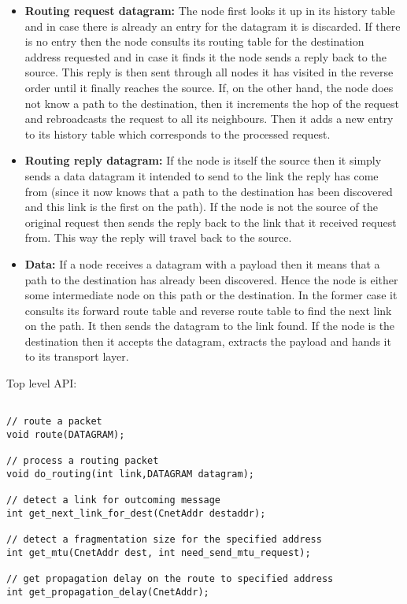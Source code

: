 \documentclass[11pt,a4paper,oneside]{report}
\begin{document}
\begin{itemize}
\item \noindent \textbf{Routing request datagram:}
The node first looks it up in its history table and in case there
is already an entry for the datagram it is discarded. If there is no entry then the node 
consults its routing table for the destination address requested and in case it finds it 
the node sends a reply back to the source. This reply is then sent through all nodes it 
has visited in the reverse order until it finally reaches the source. If, on the other hand,
the node does not know a path to the destination, then it increments the hop of the request 
and rebroadcasts the request to all its neighbours. Then it adds a new entry to its history
table which corresponds to the processed request.

\item \noindent \textbf{Routing reply datagram:}
  If the node is itself the source then it simply sends a data datagram it intended to send to the link
the reply has come from (since it now knows that a path to the destination has been discovered and 
this link is the first on the path). If the node is not the source of the original request then
 sends the reply back to the link that it received request from. This way the reply will travel back to
the source.  

\item \noindent \textbf{Data:}
  If a node receives a datagram with a payload then it means that a path to the destination has
already been discovered. Hence the node is either some intermediate node on this path or the 
destination. In the former case it consults its forward route table and reverse route table to find the next link on the path. It then sends the datagram to the link found. If the node is the destination then it accepts the datagram, extracts the payload and hands it to its transport layer.
\end{itemize}

    Top level API:  
  \begin{lstlisting}

// route a packet
void route(DATAGRAM);

// process a routing packet
void do_routing(int link,DATAGRAM datagram);

// detect a link for outcoming message
int get_next_link_for_dest(CnetAddr destaddr);

// detect a fragmentation size for the specified address
int get_mtu(CnetAddr dest, int need_send_mtu_request);

// get propagation delay on the route to specified address
int get_propagation_delay(CnetAddr);

  \end{lstlisting}
            
\end{document}
